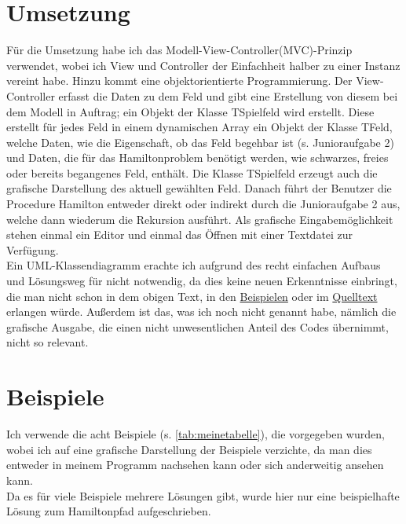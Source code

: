 \documentclass[11pt,a4paper,twocolumn,ngerman]{scrartcl}
\begin{document}
\section{Umsetzung}
Für die Umsetzung habe ich das Modell-View-Controller(MVC)-Prinzip verwendet, wobei ich View und Controller der Einfachheit halber zu einer Instanz vereint habe. Hinzu kommt eine objektorientierte Programmierung. Der View-Controller erfasst die Daten zu dem Feld und gibt eine Erstellung von diesem bei dem Modell in Auftrag; ein Objekt der Klasse TSpielfeld wird erstellt. Diese erstellt für jedes Feld in einem dynamischen Array ein Objekt der Klasse TFeld, welche Daten, wie die Eigenschaft, ob das Feld begehbar ist (s. Junioraufgabe 2) und Daten, die für das Hamiltonproblem benötigt werden, wie schwarzes, freies oder bereits begangenes Feld, enthält. Die Klasse TSpielfeld erzeugt auch die grafische Darstellung des aktuell gewählten Feld. Danach führt der Benutzer die Procedure \glqq{}Hamilton\grqq{} entweder direkt oder indirekt durch die Junioraufgabe 2 aus, welche dann wiederum die Rekursion ausführt. Als grafische Eingabemöglichkeit stehen einmal ein Editor und einmal das Öffnen mit einer Textdatei zur Verfügung.\\
Ein UML-Klassendiagramm erachte ich aufgrund des recht einfachen Aufbaus und Lösungsweg für nicht notwendig, da dies keine neuen Erkenntnisse einbringt, die man nicht schon in dem obigen Text, in den \hyperlink{section.3}{Beispielen} oder im \hyperlink{section.4}{Quelltext} erlangen würde. Außerdem ist das, was ich noch nicht genannt habe, nämlich die grafische Ausgabe, die einen nicht unwesentlichen Anteil des Codes übernimmt, nicht so relevant.\\
\section{Beispiele}
Ich verwende die acht Beispiele (s. \autoref{tab:meinetabelle}), die vorgegeben wurden, wobei ich auf eine grafische Darstellung der Beispiele verzichte, da man dies entweder in meinem Programm nachsehen kann oder sich anderweitig ansehen kann.\\
Da es für viele Beispiele mehrere Lösungen gibt, wurde hier nur eine beispielhafte Lösung zum Hamiltonpfad aufgeschrieben.
\end{document}

